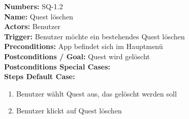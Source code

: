 \documentclass{article}
\begin{document}
    \textbf{Numbers:} SQ-1.2\\
    \textbf{Name:} Quest löschen\\
    \textbf{Actors:} Benutzer\\
    \textbf{Trigger:} Benutzer möchte ein bestehendes Quest löschen\\
    \textbf{Preconditions:}  App befindet sich im Hauptmenü\\
    \textbf{Postconditions / Goal:} Quest wird gelöscht \\
    \textbf{Postconditions Special Cases:} \\
    \textbf{Steps Default Case:} 
    \begin{enumerate}
        \item Benutzer wählt Quest aus, das gelöscht werden soll
        \item Benutzer klickt auf Quest löschen
    \end{enumerate}
\end{document}
